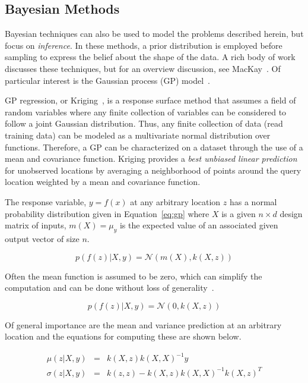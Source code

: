 \subsection{Bayesian Methods}

Bayesian techniques can also be used to model the problems described herein, but focus on \emph{inference}.
%
In these methods, a prior distribution is employed before sampling to express the belief about the shape of the data.
%
A rich body of work discusses these techniques, but for an overview discussion, see MacKay~\cite{MacKay1992b}.
%
Of particular interest is the Gaussian process (GP) model~\cite{RasmussenWilliams2006}.

GP regression, or Kriging~\cite{Stein1999}, is a response surface method that assumes a field of random variables where any finite collection of variables can be considered to follow a joint Gaussian distribution.
%
Thus, any finite collection of data (read training data) can be modeled as a multivariate normal distribution over functions.
%
Therefore, a GP can be characterized on a dataset through the use of a mean and covariance function.
%
Kriging provides a \emph{best unbiased linear prediction} for unobserved locations by averaging a neighborhood of points around the query location weighted by a mean and covariance function.

The response variable, $y=f(x)$ at any arbitrary location $z$ has a normal probability distribution given in Equation~\ref{eq:gp} where $X$ is a given $n \times d$ design matrix of inputs, $m(X) = \mu_y$ is the expected value of an associated given output vector of size $n$.

\begin{equation}
p(f(z)|X,y) = \mathcal{N}(m(X),k(X,z))
\label{eq:gp}
\end{equation}

Often the mean function is assumed to be zero, which can simplify the computation and can be done without loss of generality~\cite{Seeger2004}.

\begin{equation}
p(f(z)|X,y) = \mathcal{N}(0,k(X,z))
\label{eq:gpSimple}
\end{equation}

Of general importance are the mean and variance prediction at an arbitrary location and the equations for computing these are shown below.

\begin{eqnarray}
\mu(z|X,y) & = & k(X,z)k(X,X)^{-1}y\\
\sigma(z|X,y) & = & k(z,z) - k(X,z)k(X,X)^{-1}k(X,z)^T
\end{eqnarray}

